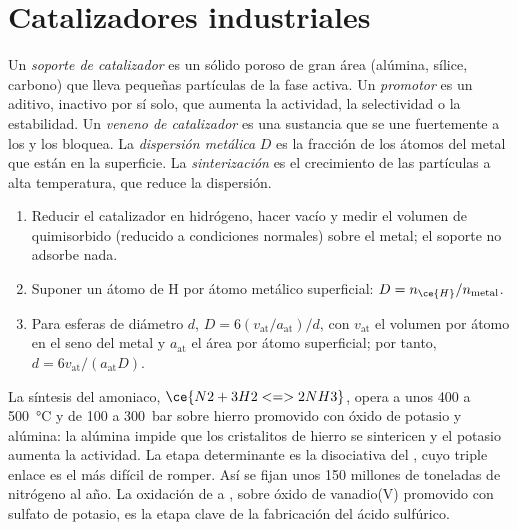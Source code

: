 \section{Catalizadores industriales}

\begin{definition}\label{def:b3:surfaces-catalysis:catalyst-design}
Un \emph{soporte de catalizador} es un sólido poroso de gran área
(alúmina, sílice, carbono) que lleva pequeñas partículas de la fase activa. Un
\emph{promotor} es un aditivo, inactivo por sí solo, que aumenta la
actividad, la selectividad o la estabilidad. Un \emph{veneno de catalizador}
es una sustancia que se une fuertemente a los  y los bloquea.
La \emph{dispersión metálica} $D$ es la fracción de los átomos del metal
que están en la superficie. La \emph{sinterización} es el crecimiento de
las partículas a alta temperatura, que reduce la dispersión.
\end{definition}

\begin{method}\label{met:b3:surfaces-catalysis:dispersion}
\begin{enumerate}
  \item Reducir el catalizador en hidrógeno, hacer vacío y medir el volumen de 
        quimisorbido (reducido a condiciones normales) sobre el metal; el
        soporte no adsorbe nada.
  \item Suponer un átomo de H por átomo metálico superficial: $D = n_{\ce{H}}/n_{\text{metal}}$.
  \item Para esferas de diámetro $d$, $D = 6(v_{\mathrm{at}}/a_{\mathrm{at}})/d$, con $v_{\mathrm{at}}$ el volumen por átomo en el
        seno del metal y $a_{\mathrm{at}}$ el área por átomo superficial; por tanto, $d = 6v_{\mathrm{at}}/(a_{\mathrm{at}}D)$.
\end{enumerate}
\end{method}

La síntesis del amoniaco, $\ce{N2 + 3 H2 <=> 2 NH3}$, opera a unos 400 a \qty{500}{\celsius} y de 100 a
\qty{300}{bar} sobre hierro promovido con óxido de potasio y alúmina: la alúmina impide que
los cristalitos de hierro se sintericen y el potasio aumenta la actividad. La
etapa determinante es la  disociativa del , cuyo triple
enlace es el más difícil de romper. Así se fijan unos 150 millones de toneladas de nitrógeno al
año.
La oxidación de  a , sobre óxido de vanadio(V) promovido
con sulfato de potasio, es la etapa clave de la fabricación del ácido sulfúrico.

